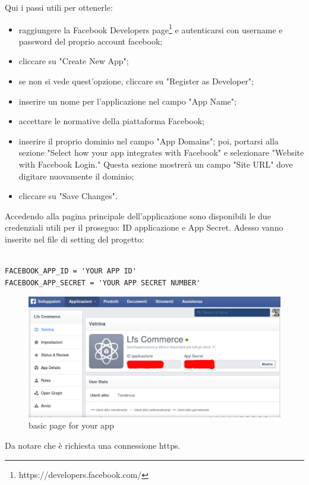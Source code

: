 Qui i passi utili per ottenerle:
\begin{itemize}
	\item raggiungere la Facebook Developers page\footnote{https://developers.facebook.com/} e autenticarsi con username e password del proprio account facebook;
	\item cliccare su "Create New App";
	\item se non si vede quest'opzione, cliccare su "Register as Developer";
	\item inserire un nome per l'applicazione nel campo "App Name";
	\item accettare le normative della piattaforma Facebook;
	\item inserire il proprio dominio nel campo "App Domains"; poi, portarsi alla sezione "Select how your app integrates with Facebook" e selezionare "Website with Facebook Login." Questa sezione mostrerà un campo "Site URL" dove digitare nuovamente il dominio;
	\item cliccare su "Save Changes".
\end{itemize}
Accedendo alla pagina principale dell'applicazione sono disponibili le due credenziali utili per il proseguo: ID applicazione e App Secret.
Adesso vanno inserite nel file di setting del progetto:

\begin{lstlisting}

FACEBOOK_APP_ID = 'YOUR APP ID'
FACEBOOK_APP_SECRET = 'YOUR APP SECRET NUMBER'

\end{lstlisting}
\begin{figure}
\centering
\includegraphics[width=0.9\columnwidth]{img/app_home2}
\caption{basic page for your app}
\end{figure}


Da notare che è richiesta una connessione https.

